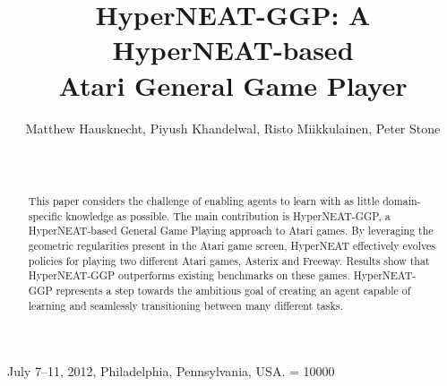 \documentclass{sig-alternate}
\begin{document}
 {July 7--11, 2012, Philadelphia, Pennsylvania, USA.}
\widowpenalty = 10000
\title{HyperNEAT-GGP: A HyperNEAT-based \\Atari General Game Player}

%
\author{
\alignauthor
Matthew Hausknecht, Piyush Khandelwal, Risto Miikkulainen, Peter Stone\\
       \\
       \\
}

\maketitle
\begin{abstract}
This paper considers the challenge of enabling agents to learn with as little domain-specific knowledge as possible. The main contribution is HyperNEAT-GGP, a HyperNEAT-based General Game Playing approach to Atari games. By leveraging the geometric regularities present in the Atari game screen, HyperNEAT effectively evolves policies for playing two different Atari games, Asterix and Freeway. Results show that HyperNEAT-GGP outperforms existing benchmarks on these games. HyperNEAT-GGP represents a step towards the ambitious goal of creating an agent capable of learning and seamlessly transitioning between many different tasks.
\end{abstract}



\end{document}
